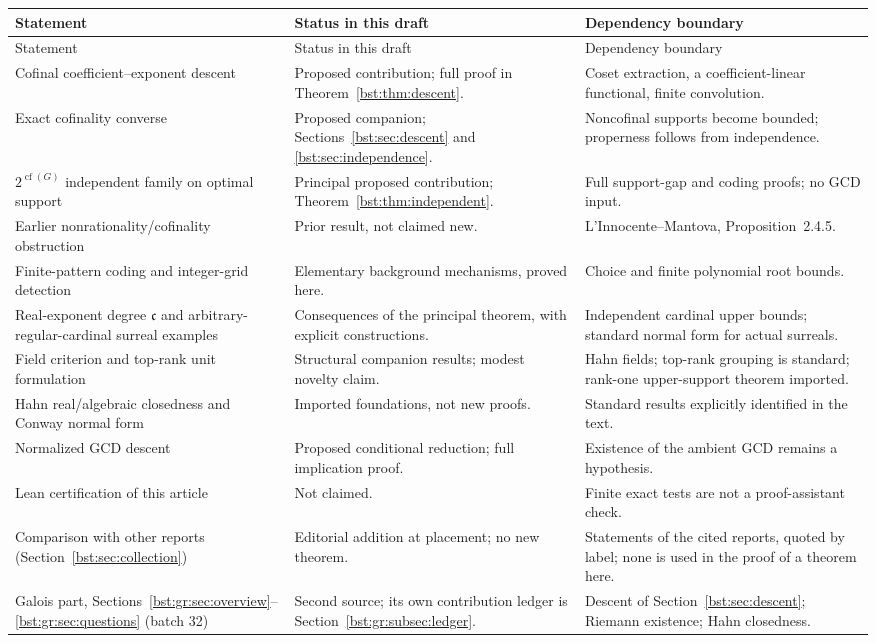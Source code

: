 \documentclass[11pt,letterpaper]{article}
\theoremstyle{definition}
\theoremstyle{remark}
\newcommand{\cof}{\operatorname{cf}}
\newcommand{\cc}{\mathfrak c}
\begin{document}
\begin{longtable}{@{}>{\raggedright\arraybackslash}p{}>{\raggedright\arraybackslash}p{}>{\raggedright\arraybackslash}p{}@{}}
\toprule
Statement & Status in this draft & Dependency boundary \\
\midrule
\endfirsthead
\toprule
Statement & Status in this draft & Dependency boundary \\
\midrule
\endhead
Cofinal coefficient--exponent descent
& Proposed contribution; full proof in Theorem~\ref{bst:thm:descent}.
& Coset extraction, a coefficient-linear functional, finite convolution. \\
Exact cofinality converse
& Proposed companion; Sections~\ref{bst:sec:descent} and \ref{bst:sec:independence}.
& Noncofinal supports become bounded; properness follows from independence. \\
$2^{\cof(G)}$ independent family on optimal support
& Principal proposed contribution; Theorem~\ref{bst:thm:independent}.
& Full support-gap and coding proofs; no GCD input. \\
Earlier nonrationality/cofinality obstruction
& Prior result, not claimed new.
& L'Innocente--Mantova, Proposition~2.4.5. \\
Finite-pattern coding and integer-grid detection
& Elementary background mechanisms, proved here.
& Choice and finite polynomial root bounds. \\
Real-exponent degree $\cc$ and arbitrary-regular-cardinal surreal examples
& Consequences of the principal theorem, with explicit constructions.
& Independent cardinal upper bounds; standard normal form for actual surreals. \\
Field criterion and top-rank unit formulation
& Structural companion results; modest novelty claim.
& Hahn fields; top-rank grouping is standard; rank-one upper-support theorem imported. \\
Hahn real/algebraic closedness and Conway normal form
& Imported foundations, not new proofs.
& Standard results explicitly identified in the text. \\
Normalized GCD descent
& Proposed conditional reduction; full implication proof.
& Existence of the ambient GCD remains a hypothesis. \\
Lean certification of this article
& Not claimed.
& Finite exact tests are not a proof-assistant check. \\
Comparison with other reports (Section~\ref{bst:sec:collection})
& Editorial addition at placement; no new theorem.
& Statements of the cited reports, quoted by label; none is used in the proof of a theorem here. \\
Galois part, Sections~\ref{bst:gr:sec:overview}--\ref{bst:gr:sec:questions} (batch 32)
& Second source; its own contribution ledger is Section~\ref{bst:gr:subsec:ledger}.
& Descent of Section~\ref{bst:sec:descent}; Riemann existence; Hahn closedness. \\
\bottomrule
\end{longtable}
\end{document}
